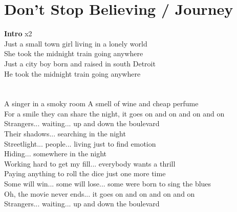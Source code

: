 \section{Don't Stop Believing / Journey}\label{sec:dontstopbelieving}
\DmajorEasy
\Amajor
\Bminor
\Gmajor
\FsharpMinor

\textbf{Intro}     x2\\
Just a small town girl  living in a lonely world\\
She took the midnight train going anywhere \\
Just a city boy  born and raised in south Detroit\\
He took the midnight train going anywhere \\
   \\
   \\
 A singer in a smoky room  A smell of wine and cheap perfume\\
 For a smile they can share the night, it goes on and on and on and on\\
Strangers... waiting...  up and down the boulevard\\
Their shadows... searching in the night\\
Streetlight... people...  living just to find emotion\\
Hiding... somewhere in the night\\
 Working hard to get my fill...  everybody wants a thrill\\
 Paying anything to roll the dice just one more time \\
 Some will win...  some will lose...  some were born to sing the blues\\
 Oh, the movie never ends... it goes on and on and on and on\\
Strangers... waiting...  up and down the boulevard\\
